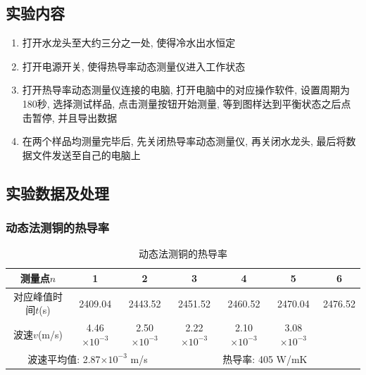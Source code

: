 \documentclass[zihao=5, UTF8]{article}
\theoremstyle{MyLineTheoremStyle} %
\theoremstyle{MyBlockTheoremStyle} %
\theoremstyle{MySubsubsectionStyle} %
\begin{document}
\subsection{实验内容}
\begin{enumerate}
    \item 打开水龙头至大约三分之一处, 使得冷水出水恒定
    \item 打开电源开关, 使得热导率动态测量仪进入工作状态
    \item 打开热导率动态测量仪连接的电脑, 打开电脑中的对应操作软件, 设置周期为180秒, 选择测试样品, 点击测量按钮开始测量, 等到图样达到平衡状态之后点击暂停, 并且导出数据
    \item 在两个样品均测量完毕后, 先关闭热导率动态测量仪, 再关闭水龙头, 最后将数据文件发送至自己的电脑上
\end{enumerate}
\subsection{实验数据及处理}
\subsubsection{动态法测铜的热导率}
\begin{table}[H]
\centering
\begin{tabular}{|c|c|c|c|c|c|c|} 
\hline
测量点$n$       & 1       & 2       & 3       & 4       & 5       & 6        \\ 
\hline
对应峰值时间$t$(s) & 2409.04 & 2443.52 & 2451.52 & 2460.52 & 2470.04 & 2476.52  \\ 
\hline
波速$v$(m/s)   & 4.46$\times 10^{-3}$    & 2.50$\times 10^{-3}$    & 2.22$\times 10^{-3}$    & 2.10$\times 10^{-3}$    & 3.08$\times 10^{-3}$    & ~        \\ 
\hline
\multicolumn{3}{|c|}{波速平均值: 2.87$\times 10^{-3}$ m/s}  & \multicolumn{4}{c|}{热导率: 405 W/mK}                \\
\hline
\end{tabular}
\caption{动态法测铜的热导率}
\label{tab:cu}
\end{table}
 
\end{document}
